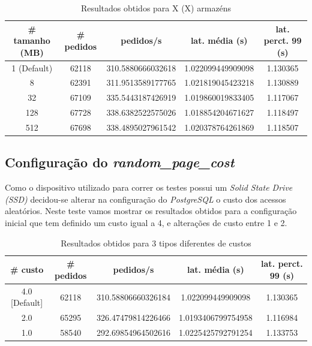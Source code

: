 \begin{table}[!h]
\center
\small
\begin{tabular}{|c|c|c|c|c|}
\hline
\textbf{\# tamanho (MB)} & \textbf{\# pedidos} & \textbf{pedidos/s} & \textbf{lat. média (s)} & \textbf{lat. perct. 99 (s)}  \\ \hline
1 (Default) & 62118 & 310.5880666032618 & 1.022099449909098 & 1.130365  \\ \hline
8 & 62391 & 311.9513589177765 & 1.021819045423218 & 1.130889  \\ \hline
32 & 67109 & 335.5443187426919 & 1.019860019833405 & 1.117067  \\ \hline
128 & 67728 & 338.6382522575026 & 1.018854204671627 & 1.118497  \\ \hline
512 & 67698 & 338.4895027961542 & 1.020378764261869 & 1.118507  \\ \hline
\end{tabular}
\caption{Resultados obtidos para X (X) armazéns}
\end{table}


\subsection{Configuração do \textit{random\_page\_cost}}

Como o dispositivo utilizado para correr os testes possui um \textit{Solid State Drive (SSD)} decidou-se alterar na configuração do \textit{PostgreSQL} o custo dos acessos aleatórios. Neste teste vamos mostrar os resultados obtidos para a configuração inicial que tem definido um custo igual a 4, e alterações de custo entre 1 e 2.


\begin{table}[!h]
\center
\small
\begin{tabular}{|c|c|c|c|c|}
\hline
\textbf{\# custo} & \textbf{\# pedidos} & \textbf{pedidos/s} & \textbf{lat. média (s)} & \textbf{lat. perct. 99 (s)}  \\ \hline
4.0 [Default] & 62118 & 310.58806660326184 & 1.022099449909098 & 1.130365  \\ \hline
2.0 & 65295 & 326.47479814226466 & 1.0193406799754958 & 1.116984  \\ \hline
1.0 & 58540 & 292.69854964502616 & 1.0225425792791254 & 1.133753  \\ \hline
\end{tabular}
\caption{Resultados obtidos para 3 tipos diferentes de custos}
\end{table}


